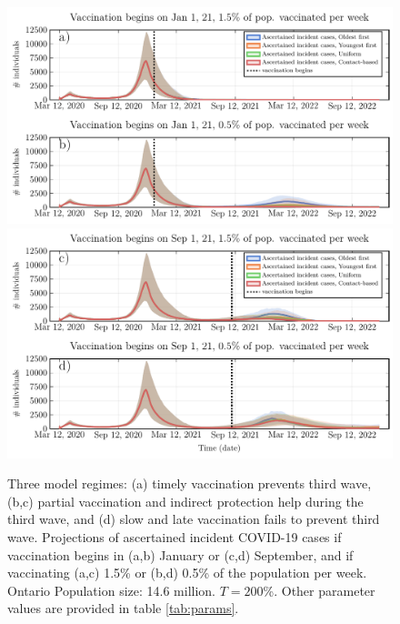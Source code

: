 \begin{figure}
\includegraphics[width=\textwidth]{chapter_1/main_text_ts_1.pdf}
\includegraphics[width=\textwidth]{chapter_1/main_text_ts_2.pdf}
\caption{Three model regimes: (a) timely vaccination prevents third wave, (b,c) partial vaccination and indirect protection help during the third wave, and (d) slow and late vaccination fails to prevent third wave.  Projections of ascertained incident COVID-19 cases if vaccination begins in (a,b) January or (c,d) September, and if vaccinating (a,c) 1.5\% or (b,d) 0.5\% of the population per week. Ontario Population size: 14.6 million. $T = 200$\%. Other parameter values are provided in table \ref{tab:params}.}
\label{fig3}
\end{figure}


